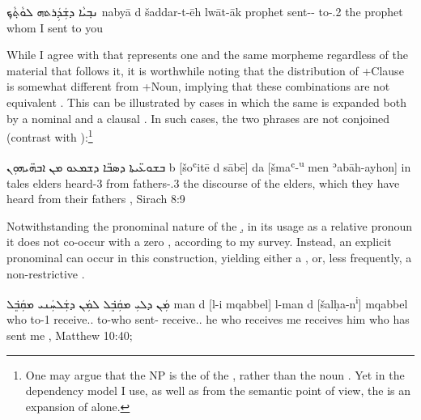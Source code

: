 {{  
  {ܢܒ݂ܝܵܐ ܕܫܲܕܲܪܬ݀ܗ ܠܘܵܬ݂ܵ\hspace{-0.3ex}ܟ݂}
  {nabyā d\cb{} šaddar-t-ēh lwāt-āk}
  {prophet \lnk\cb{} sent-\sg-\masc{} to-\poss.2\masc}
  {the prophet whom I sent to you}
  {\cite[63, \S 77]{MuraokaSyriac}}
  
  
 
  While I agree with \citet{GoldenbergAttribution} that \d represents one and the same morpheme regardless of the material that follows it, it is worthwhile noting that the distribution of \D+Clause is somewhat different from \D+Noun, implying that these combinations are not equivalent  \citep[245f.]{PeursenBenSira}. This can be illustrated by cases in which the same \prim is expanded both by a nominal and a clausal \secn. In such cases, the two \d phrases are not conjoined (contrast with ):\footnote{One may argue that the NP  is the \prim of the , rather than the noun . Yet in the dependency model I use, as well as from the semantic point of view, the  is an expansion of  alone.}
  
  {ܒܫܘܥ̈ܝܬܐ ܕܣܒ̈ܐ ܕܫܡܥܘ ܡܢ ܐܒܗ̈ܝܗܘܼ\hspace{-0.7ex}ܢ}
  {b\cb{} [šoʿitē d\cb{} sābē] da\cb{} [šmaʿ-\textsuperscript{u} men ʾabāh-ayhon]}
  {in\cb{} tales \lnk\cb{} elders \lnk\cb{} heard-3\pl{} from fathers-\poss.3\pl}
  {the discourse of the elders, which they have heard from their fathers}
  {\Pesh, Sirach 8:9 \apud \cite[232]{PeursenBenSira}}

  
  Notwithstanding the pronominal nature of the \lnk* \d, in its usage as a relative pronoun it does not co-occur with a zero \prim, according to my survey. Instead, an explicit pronominal \prim can occur in this construction, yielding either a , or, less frequently, a non-restrictive .
  
  {ܡܲܢ ܕܠܝܼ ܡܩܲܒܸ݁ܠ ܠܡܲܢ ܕܫܲܠܚܲܢܝ ܡܩܲܒܸ݁ܠ}
  {man d\cb{} [l-i mqabbel] l-man d\cb{} [šalḥa-n\textsuperscript{i}] mqabbel}
  {who \lnk\cb{} to-1\sg{} receive.\ptcp.\masc{}  to-who \lnk\cb{} sent-\sg{} receive.\ptcp.\masc{}}
  {he who receives me receives him who has sent me\footnotemark}
  {\Pesh, Matthew 10:40; \cite[87, \S 111]{MuraokaSyriac}}
  
}}
